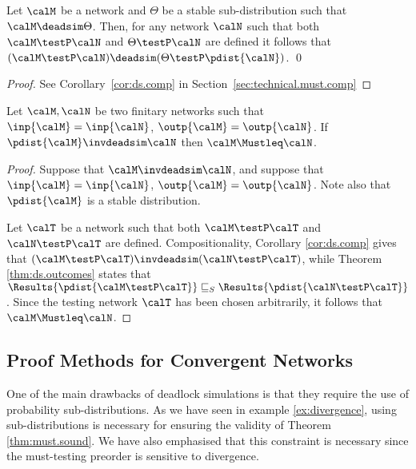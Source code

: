 \documentclass{LMCS}
\begin{document}
\begin{thm}[Compositionality]
\label{thm:ds.comp}
Let $\calM$ be a network and $\Theta$ be a stable sub-distribution 
such that $\calM \deadsim \Theta$. Then, for any network $\calN$ such 
that both $\calM \testP \calN$ and $\Theta \testP \calN$ are defined 
it follows that $(\calM \testP \calN) \deadsim (\Theta \testP \pdist{\calN})$.
\qed
\end{thm}

\begin{proof}

See Corollary~\ref{cor:ds.comp} in Section~\ref{sec:technical.must.comp}
\end{proof}



\begin{thm}
\label{thm:must.sound}
Let $\calM, \calN$ be two finitary networks 
such that $\inp{\calM} = \inp{\calN}$, $\outp{\calM} = 
\outp{\calN}$. If $\pdist{\calM} \invdeadsim \calN$ 
then $\calM \Mustleq \calN$.
\end{thm}
\begin{proof}
Suppose that $\calM \invdeadsim \calN$, 
and suppose that $\inp{\calM} = \inp{\calN}$, 
$\outp{\calM} = \outp{\calN}$. Note also that 
$\pdist{\calM}$ is a stable distribution. 

Let $\calT$ be a network such that both 
$\calM \testP \calT$ and $\calN \testP \calT$ 
are defined. 
Compositionality, Corollary \ref{cor:ds.comp} 
gives that $(\calM \testP \calT) \invdeadsim 
(\calN \testP \calT)$, while Theorem \ref{thm:ds.outcomes} 
states that $\Results{\pdist{\calM \testP \calT}} \sqsubseteq_S 
\Results{\pdist{\calN \testP \calT}}$. Since the 
testing network $\calT$ has been chosen arbitrarily, it 
follows that $\calM \Mustleq \calN$.
\end{proof}




\subsection{Proof Methods for Convergent Networks}
\label{sec:convergent}

One of the main drawbacks of deadlock simulations 
is that they require the use of probability sub-distributions. 
As we have seen in example \ref{ex:divergence}, 
using sub-distributions is necessary for ensuring 
the validity of Theorem \ref{thm:must.sound}. We 
have also emphasised that this constraint is necessary since 
the must-testing preorder is sensitive to divergence. 
\end{document}
